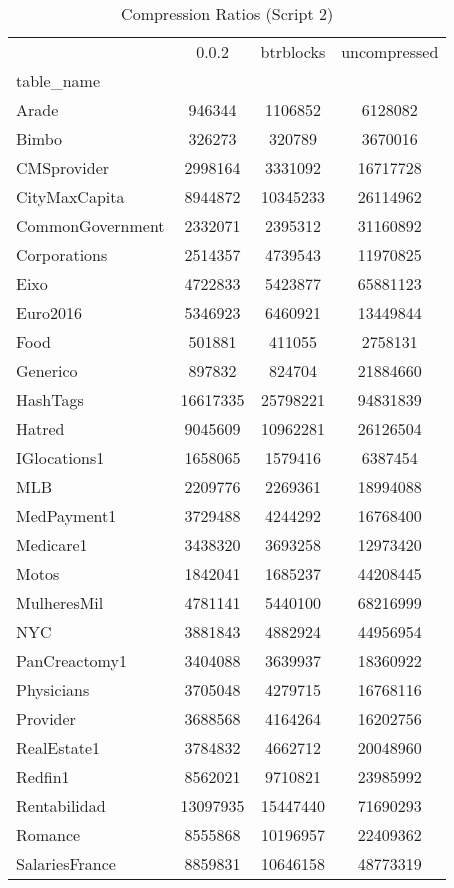 \begin{table}
\caption{Compression Ratios (Script 2)}
\label{tab:table\_2}
\begin{tabular}{|l|c|c|c|}
\toprule
 & 0.0.2 & btrblocks & uncompressed \\
table\_name &  &  &  \\
\midrule
Arade & 946344 & 1106852 & 6128082 \\
Bimbo & 326273 & 320789 & 3670016 \\
CMSprovider & 2998164 & 3331092 & 16717728 \\
CityMaxCapita & 8944872 & 10345233 & 26114962 \\
CommonGovernment & 2332071 & 2395312 & 31160892 \\
Corporations & 2514357 & 4739543 & 11970825 \\
Eixo & 4722833 & 5423877 & 65881123 \\
Euro2016 & 5346923 & 6460921 & 13449844 \\
Food & 501881 & 411055 & 2758131 \\
Generico & 897832 & 824704 & 21884660 \\
HashTags & 16617335 & 25798221 & 94831839 \\
Hatred & 9045609 & 10962281 & 26126504 \\
IGlocations1 & 1658065 & 1579416 & 6387454 \\
MLB & 2209776 & 2269361 & 18994088 \\
MedPayment1 & 3729488 & 4244292 & 16768400 \\
Medicare1 & 3438320 & 3693258 & 12973420 \\
Motos & 1842041 & 1685237 & 44208445 \\
MulheresMil & 4781141 & 5440100 & 68216999 \\
NYC & 3881843 & 4882924 & 44956954 \\
PanCreactomy1 & 3404088 & 3639937 & 18360922 \\
Physicians & 3705048 & 4279715 & 16768116 \\
Provider & 3688568 & 4164264 & 16202756 \\
RealEstate1 & 3784832 & 4662712 & 20048960 \\
Redfin1 & 8562021 & 9710821 & 23985992 \\
Rentabilidad & 13097935 & 15447440 & 71690293 \\
Romance & 8555868 & 10196957 & 22409362 \\
SalariesFrance & 8859831 & 10646158 & 48773319 \\

\end{tabular}
\end{table}
